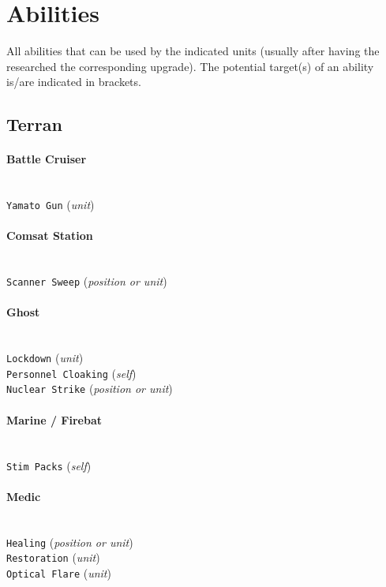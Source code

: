 \section{Abilities}
\label{abilities}
All abilities that can be used by the indicated units (usually after having the researched the corresponding upgrade). The potential target(s) of an ability is/are indicated in brackets.

\subsection{Terran}

\paragraph{Battle Cruiser} \mbox{}\\
\verb|Yamato Gun| (\textit{unit}) \\

\paragraph{Comsat Station} \mbox{}\\
\verb|Scanner Sweep| (\textit{position or unit}) \\

\paragraph{Ghost} \mbox{}\\
\verb|Lockdown| (\textit{unit}) \\
\verb|Personnel Cloaking| (\textit{self}) \\
\verb|Nuclear Strike| (\textit{position or unit})

\paragraph{Marine / Firebat} \mbox{}\\
\verb|Stim Packs| (\textit{self})

\paragraph{Medic} \mbox{}\\
\verb|Healing| (\textit{position or unit}) \\
\verb|Restoration| (\textit{unit}) \\
\verb|Optical Flare| (\textit{unit})


